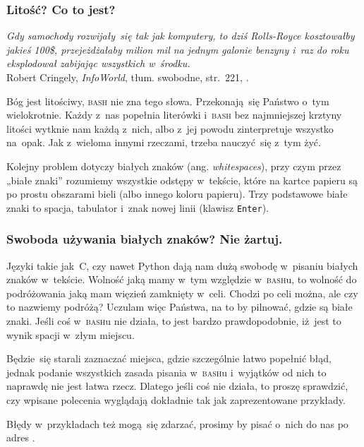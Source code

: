 \documentclass[10pt,t]{beamer}
\begin{document}
\begin{frame}
  \frametitle{Litość? Co to jest?}


  \textit{Gdy samochody rozwijały~się tak jak komputery, to dziś
    Rolls-Royce kosztowałby jakieś 100\$, przejeżdżałaby milion mil na
    jednym galonie benzyny i~raz do roku eksplodował zabijając wszystkich
    w~środku.} \\
  Robert Cringely, \textit{InfoWorld}, tłum. swobodne, str.~221,
  \parencite{Garfinkel-Weise-Strassmann-The-UNIX-HATERS-Handbook-Pub-1994}.

  Bóg jest litościwy, \textsc{bash} nie zna tego słowa. Przekonają~się
  Państwo o~tym wielokrotnie. Każdy z~nas popełnia literówki i~\textsc{bash}
  bez najmniejszej krztyny litości wytknie nam każdą z~nich, albo
  z~jej powodu zinterpretuje wszystko na~opak. Jak z~wieloma innymi
  rzeczami, trzeba nauczyć~się z~tym żyć.

  Kolejny problem dotyczy białych znaków (ang. \textit{whitespaces}), przy
  czym przez „białe znaki” rozumiemy wszystkie odstępy w~tekście, które na
  kartce papieru są po prostu obszarami bieli (albo innego koloru papieru).
  Trzy podstawowe białe znaki to spacja, tabulator i~znak nowej linii
  (klawisz \texttt{Enter}).

\end{frame}





\begin{frame}
  \frametitle{Swoboda używania białych znaków? Nie żartuj.}


  Języki takie jak~C, czy nawet Python dają nam dużą swobodę
  w~pisaniu białych znaków w~tekście. Wolność jaką mamy w~tym względzie
  w~\textsc{bash}u, to wolność do podróżowania jaką mam więzień zamknięty
  w~celi. Chodzi po celi można, ale czy to nazwiemy podróżą? Uczulam więc
  Państwa, na to by pilnować, gdzie są białe znaki. Jeśli coś
  w~\textsc{bash}u nie działa, to jest bardzo prawdopodobnie, iż~jest to
  wynik spacji w~złym miejscu.

  Będzie~się starali zaznaczać miejsca, gdzie szczególnie łatwo popełnić
  błąd, jednak podanie wszystkich zasada pisania w~\textsc{bash}u i~wyjątków
  od nich to naprawdę nie jest łatwa rzecz. Dlatego jeśli coś nie działa,
  to proszę sprawdzić, czy wpisane polecenia wyglądają \alert{dokładnie}
  tak jak zaprezentowane przykłady.

  Błędy w~przykładach też mogą~się zdarzać, prosimy by pisać o~nich do nas
  po adres \email.

\end{frame}
\end{document}
